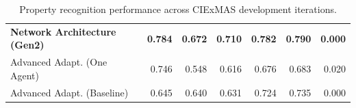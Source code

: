 \documentclass[a4paper,oneside,bibliography=totoc]{scrbook}
\begin{document}
\begin{table}[h]
\begin{tabular}{p{4cm}|rrrrrr}
    \textbf{Network Architecture (Gen2)} & \textbf{0.784}                                   & \textbf{0.672} & \textbf{0.710} & \textbf{0.782} & \textbf{0.790} & \textbf{0.000} \\
    Advanced Adapt. (One Agent)          & 0.746                                            & 0.548          & 0.616          & 0.676          & 0.683          & 0.020          \\
    Advanced Adapt. (Baseline)           & 0.645                                            & 0.640          & 0.631          & 0.724          & 0.735          & 0.000          \\
    \bottomrule
  \end{tabular}
  \caption{Property recognition performance across CIExMAS development iterations.}
  \label{tab:evaluation_properties_iterations}
\end{table}
\end{document}
